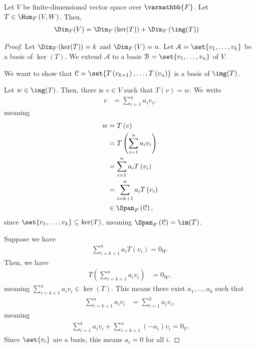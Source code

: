\documentclass[10pt]{mypackage}
\renewcommand*{\mathbb}[1]{\varmathbb{#1}}
\begin{document}
\begin{theorem}
  Let $V$ be finite-dimensional vector space over $\mathbb{F}$. Let $T\in \Hom_{F}\left(V,W\right)$. Then,
  \begin{align*}
    \Dim_{F}(V) &= \Dim_{F}\left(\ker (T)\right) + \Dim_{F}\left(\img (T)\right)
  \end{align*}
\end{theorem}
\begin{proof}
  Let $\Dim_{F}\left(\ker(T)\right) = k$ and $\Dim_{F}\left(V\right) = n$. Let $\mathcal{A} = \set{v_1,\dots,v_k}$ be a basis of $\ker(T)$. We extend $\mathcal{A}$ to a basis $\mathcal{B} = \set{v_1,\dots,v_n}$ of $V$.\newline

  We want to show that $\mathcal{C} = \set{T\left(v_{k+1}\right),\dots,T\left(v_n\right)}$ is a basis of $\img(T)$.\newline

  Let $w\in \img(T)$. Then, there is $v\in V$ such that $T(v) = w$. We write
  \begin{align*}
    v &= \sum_{i=1}^{n}a_iv_i,
  \end{align*}
  meaning
  \begin{align*}
    w &= T\left(v\right)\\
      &= T\left(\sum_{i=1}^{n}a_iv_i\right)\\
      &= \sum_{i=1}^{n}a_iT\left(v_i\right)\\
      &= \sum_{i=k+1}^{n}a_iT\left(v_i\right)\\
      &\in \Span_{F}\left(\mathcal{C}\right),
  \end{align*}
  since $\set{v_1,\dots,v_k}\subseteq \ker(T)$, meaning $\Span_{F}\left(\mathcal{C}\right) = \im(T)$.\newline

  Suppose we have
  \begin{align*}
    \sum_{i=k+1}^{n}a_iT\left(v_i\right) = 0_W.
  \end{align*}
  Then, we have
  \begin{align*}
    T\left(\sum_{i=k+1}^{n}a_iv_i\right) &= 0_W,
  \end{align*}
  meaning $\sum_{i=k+1}^{n}a_iv_i\in \ker(T)$. This means there exist $a_1,\dots,a_k$ such that
  \begin{align*}
    \sum_{i=k+1}^{n}a_iv_i &= \sum_{i=1}^{k}a_iv_i,
  \end{align*}
  meaning
  \begin{align*}
    \sum_{i=1}^{k}a_iv_i + \sum_{i=k+1}^{n}\left(-a_i\right)v_i = 0_V.
  \end{align*}
  Since $\set{v_i}$ are a basis, this means $a_i = 0$ for all $i$.
\end{proof}
\end{document}
